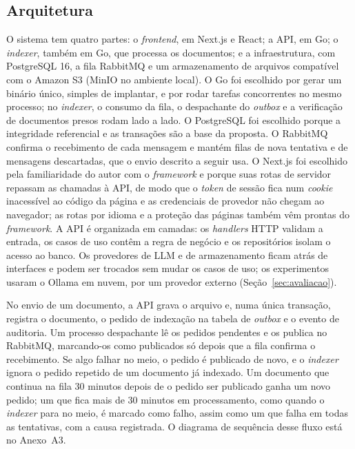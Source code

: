 \documentclass[12pt]{article}
\begin{document}
\subsection{Arquitetura}
\label{sec:arquitetura}

O sistema tem quatro partes: o \emph{frontend}, em Next.js e React; a API, em Go; o \emph{indexer}, também em Go, que processa os documentos; e a infraestrutura, com PostgreSQL 16, a fila RabbitMQ e um armazenamento de arquivos compatível com o Amazon S3 (MinIO no ambiente local). O Go foi escolhido por gerar um binário único, simples de implantar, e por rodar tarefas concorrentes no mesmo processo; no \emph{indexer}, o consumo da fila, o despachante do \emph{outbox} e a verificação de documentos presos rodam lado a lado. O PostgreSQL foi escolhido porque a integridade referencial e as transações são a base da proposta. O RabbitMQ confirma o recebimento de cada mensagem e mantém filas de nova tentativa e de mensagens descartadas, que o envio descrito a seguir usa. O Next.js foi escolhido pela familiaridade do autor com o \emph{framework} e porque suas rotas de servidor repassam as chamadas à API, de modo que o \emph{token} de sessão fica num \emph{cookie} inacessível ao código da página e as credenciais de provedor não chegam ao navegador; as rotas por idioma e a proteção das páginas também vêm prontas do \emph{framework}. A API é organizada em camadas: os \emph{handlers} HTTP validam a entrada, os casos de uso contêm a regra de negócio e os repositórios isolam o acesso ao banco. Os provedores de LLM e de armazenamento ficam atrás de interfaces e podem ser trocados sem mudar os casos de uso; os experimentos usaram o Ollama em nuvem, por um provedor externo (Seção~\ref{sec:avaliacao}).

No envio de um documento, a API grava o arquivo e, numa única transação, registra o documento, o pedido de indexação na tabela de \emph{outbox} e o evento de auditoria. Um processo despachante lê os pedidos pendentes e os publica no RabbitMQ, marcando-os como publicados só depois que a fila confirma o recebimento. Se algo falhar no meio, o pedido é publicado de novo, e o \emph{indexer} ignora o pedido repetido de um documento já indexado. Um documento que continua na fila 30 minutos depois de o pedido ser publicado ganha um novo pedido; um que fica mais de 30 minutos em processamento, como quando o \emph{indexer} para no meio, é marcado como falho, assim como um que falha em todas as tentativas, com a causa registrada. O diagrama de sequência desse fluxo está no Anexo~A3.
\end{document}
